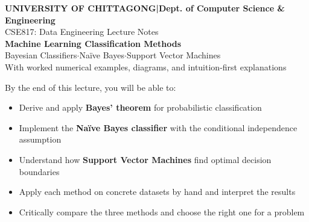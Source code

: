 \documentclass[12pt,a4paper]{article}
\begin{document}
\thispagestyle{empty}

\vspace*{1.2cm}
{\color{white}\noindent\hspace{0.5cm}%
\begin{minipage}{0.9\textwidth}
  \color{white}
  {\fontsize{11}{13}\selectfont\textbf{UNIVERSITY OF CHITTAGONG\enspace|\enspace Dept. of Computer Science \& Engineering}}\\[4pt]
  {\fontsize{10}{12}\selectfont CSE817: Data Engineering \quad\textbullet\quad Lecture Notes}\\[14pt]
  {\fontsize{28}{34}\selectfont\bfseries Machine Learning Classification Methods}\\[10pt]
  {\fontsize{16}{20}\selectfont Bayesian Classifiers\enspace$\cdot$\enspace Na\"{i}ve Bayes\enspace$\cdot$\enspace Support Vector Machines}\\[18pt]
  {\fontsize{11}{14}\selectfont\color{LightBlue} With worked numerical examples, diagrams, and intuition-first explanations}
\end{minipage}}

\vspace{3cm}

\begin{tcolorbox}[defbox, title={Learning Objectives}]
By the end of this lecture, you will be able to:
\begin{itemize}[leftmargin=1.4em, itemsep=2pt]
  \item Derive and apply \textbf{Bayes' theorem} for probabilistic classification
  \item Implement the \textbf{Na\"{i}ve Bayes classifier} with the conditional independence assumption
  \item Understand how \textbf{Support Vector Machines} find optimal decision boundaries
  \item Apply each method on concrete datasets by hand and interpret the results
  \item Critically compare the three methods and choose the right one for a problem
\end{itemize}
\end{tcolorbox}
\end{document}
